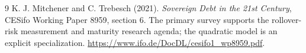 \documentclass[11pt,a4paper]{article}
\begin{document}
\begin{thebibliography}{9}
 K. J. Mitchener and C. Trebesch (2021).
\emph{Sovereign Debt in the 21st Century}, CESifo Working Paper 8959, section 6.
The primary survey supports the rollover-risk measurement and maturity research agenda; the quadratic model is an explicit specialization.
\url{https://www.ifo.de/DocDL/cesifo1_wp8959.pdf}.
\end{thebibliography}
\end{document}
